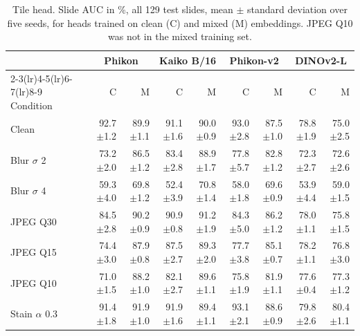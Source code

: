 \begin{table}[H]\centering\small
\caption{Tile head. Slide AUC in \%, all 129 test slides, mean $\pm$ standard deviation over five seeds, for heads trained on clean (C) and mixed (M) embeddings. JPEG Q10 was not in the mixed training set.}
\label{tab:app-tileprobe}
\setlength{\tabcolsep}{3.5pt}
\begin{tabular}{lrrrrrrrr}
\toprule
 & \multicolumn{2}{c}{Phikon} & \multicolumn{2}{c}{Kaiko B/16} & \multicolumn{2}{c}{Phikon-v2} & \multicolumn{2}{c}{DINOv2-L}\\
\cmidrule(lr){2-3}\cmidrule(lr){4-5}\cmidrule(lr){6-7}\cmidrule(lr){8-9}
Condition & C & M & C & M & C & M & C & M\\
\midrule
Clean & 92.7{\scriptsize$\pm$1.2} & 89.9{\scriptsize$\pm$1.1} & 91.1{\scriptsize$\pm$1.6} & 90.0{\scriptsize$\pm$0.9} & 93.0{\scriptsize$\pm$2.8} & 87.5{\scriptsize$\pm$1.0} & 78.8{\scriptsize$\pm$1.9} & 75.0{\scriptsize$\pm$2.5}\\
Blur $\sigma$ 2 & 73.2{\scriptsize$\pm$2.0} & 86.5{\scriptsize$\pm$1.2} & 83.4{\scriptsize$\pm$2.8} & 88.9{\scriptsize$\pm$1.7} & 77.8{\scriptsize$\pm$5.7} & 82.8{\scriptsize$\pm$1.2} & 72.3{\scriptsize$\pm$2.7} & 72.6{\scriptsize$\pm$2.6}\\
Blur $\sigma$ 4 & 59.3{\scriptsize$\pm$4.0} & 69.8{\scriptsize$\pm$1.2} & 52.4{\scriptsize$\pm$3.9} & 70.8{\scriptsize$\pm$1.4} & 58.0{\scriptsize$\pm$1.8} & 69.6{\scriptsize$\pm$0.9} & 53.9{\scriptsize$\pm$4.4} & 59.0{\scriptsize$\pm$1.5}\\
JPEG Q30 & 84.5{\scriptsize$\pm$2.8} & 90.2{\scriptsize$\pm$0.9} & 90.9{\scriptsize$\pm$0.8} & 91.2{\scriptsize$\pm$1.9} & 84.3{\scriptsize$\pm$5.0} & 86.2{\scriptsize$\pm$1.2} & 78.0{\scriptsize$\pm$1.1} & 75.8{\scriptsize$\pm$1.5}\\
JPEG Q15 & 74.4{\scriptsize$\pm$3.0} & 87.9{\scriptsize$\pm$0.8} & 87.5{\scriptsize$\pm$2.7} & 89.3{\scriptsize$\pm$2.0} & 77.7{\scriptsize$\pm$3.8} & 85.1{\scriptsize$\pm$0.7} & 78.2{\scriptsize$\pm$1.1} & 76.8{\scriptsize$\pm$3.0}\\
JPEG Q10 & 71.0{\scriptsize$\pm$1.5} & 88.2{\scriptsize$\pm$1.0} & 82.1{\scriptsize$\pm$2.7} & 89.6{\scriptsize$\pm$1.1} & 75.8{\scriptsize$\pm$1.9} & 81.9{\scriptsize$\pm$1.1} & 77.6{\scriptsize$\pm$0.4} & 77.3{\scriptsize$\pm$1.2}\\
Stain $\alpha$ 0.3 & 91.4{\scriptsize$\pm$1.8} & 91.9{\scriptsize$\pm$1.0} & 91.9{\scriptsize$\pm$1.6} & 89.4{\scriptsize$\pm$1.1} & 93.1{\scriptsize$\pm$2.1} & 88.6{\scriptsize$\pm$0.9} & 79.8{\scriptsize$\pm$2.6} & 80.4{\scriptsize$\pm$1.1}\\
\bottomrule
\end{tabular}
\end{table}

